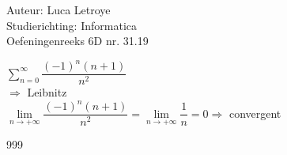 \documentclass[a4paper]{article}
\begin{document}
  
\noindent \large Auteur: Luca Letroye \\
\noindent \large Studierichting: Informatica\\
\noindent \large Oefeningenreeks 6D nr. 31.19

\medskip
\normalsize

$ \displaystyle\sum_{n=0}^{\infty} \dfrac{(-1)^n(n+1)}{n^2}$\\

$\Rightarrow $ Leibnitz\\

$\lim\limits_{n\rightarrow +\infty} \dfrac{(-1)^n(n+1)}{n^2} = \lim\limits_{n\rightarrow +\infty} \dfrac{1}{n} = 0 \Rightarrow$ convergent\\










\begin{thebibliography}{999}
\end{thebibliography}
\end{document}

